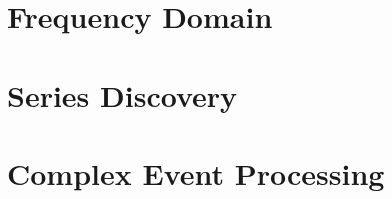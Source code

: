 \documentclass[11pt,color=green,table]{elegantbook}
\begin{document}
\chapter{Frequency Domain}






\chapter{Series Discovery}




\chapter{Complex Event Processing}







\end{document}

